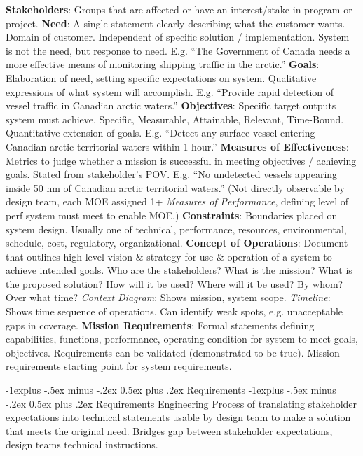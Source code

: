 \documentclass[letterpaper, 8pt]{extarticle}
\makeatletter
\renewcommand{\section}{\@startsection{section}{1}{0mm}%
                                {-1explus -.5ex minus -.2ex}%
                                {0.5ex plus .2ex}%
                                {\normalfont\normalsize\bfseries}}
\renewcommand{\subsection}{\@startsection{subsection}{2}{0mm}%
                                {-1explus -.5ex minus -.2ex}%
                                {0.5ex plus .2ex}%
                                {\normalfont\small\bfseries}}
\makeatother
\begin{document}
\begin{multicols*}{4}
\textbf{Stakeholders}:
Groups that are affected or have an interest/stake in program or project.
\textbf{Need}:
A single statement clearly describing what the customer wants.
Domain of customer. Independent of specific solution / implementation.
System is not the need, but response to need.
E.g. ``The Government of Canada needs a more effective means of monitoring shipping traffic in the arctic.''
\textbf{Goals}:
Elaboration of need, setting specific expectations on system.
Qualitative expressions of what system will accomplish.
E.g. ``Provide rapid detection of vessel traffic in Canadian arctic waters.''
\textbf{Objectives}:
Specific target outputs system must achieve.
Specific, Measurable, Attainable, Relevant, Time-Bound.
Quantitative extension of goals.
E.g. ``Detect any surface vessel entering Canadian arctic territorial waters within 1 hour.''
\textbf{Measures of Effectiveness}:
Metrics to judge whether a mission is successful in meeting objectives / achieving goals.
Stated from stakeholder's POV.
E.g. ``No undetected vessels appearing inside 50 nm of Canadian arctic territorial waters.''
(Not directly observable by design team, each MOE assigned 1+ \textit{Measures of Performance},
defining level of perf system must meet to enable MOE.)
\textbf{Constraints}:
Boundaries placed on system design. Usually one of
technical, performance, resources, environmental,
schedule, cost, regulatory, organizational.
\textbf{Concept of Operations}:
Document that outlines high-level vision \& strategy for use \& operation of a system to achieve intended goals.
Who are the stakeholders?
What is the mission?
What is the proposed solution?
How will it be used?
Where will it be used?
By whom?
Over what time?
\textit{Context Diagram}:
Shows mission, system scope.
\textit{Timeline}:
Shows time sequence of operations.
Can identify weak spots, e.g. unacceptable gaps in coverage.
\textbf{Mission Requirements}:
Formal statements defining capabilities, functions, performance, operating condition for system to meet goals, objectives.
Requirements can be validated (demonstrated to be true).
Mission requirements starting point for system requirements.

\section{Requirements}
\subsection{Requirements Engineering}
Process of translating stakeholder expectations into technical statements
usable by design team to make a solution that meets the original need.
Bridges gap between stakeholder expectations, design teams technical instructions.


\end{multicols*}
\end{document}
